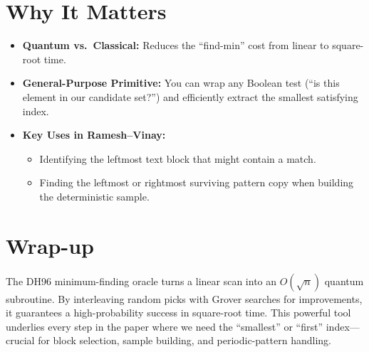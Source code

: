 \documentclass[11pt]{article}
\begin{document}
\section*{Why It Matters}
\begin{itemize}
    \item \textbf{Quantum vs.\ Classical:} Reduces the “find-min” cost from linear to square-root time.
    \item \textbf{General-Purpose Primitive:} You can wrap any Boolean test (“is this element in our candidate set?”) and efficiently extract the smallest satisfying index.
    \item \textbf{Key Uses in Ramesh--Vinay:}
          \begin{itemize}
              \item Identifying the leftmost text block that might contain a match.
              \item Finding the leftmost or rightmost surviving pattern copy when building the deterministic sample.
          \end{itemize}
\end{itemize}

\section*{Wrap-up}
The DH96 minimum-finding oracle turns a linear scan into an \(O(\sqrt{n})\) quantum subroutine. By interleaving random picks with Grover searches for improvements, it guarantees a high-probability success in square-root time. This powerful tool underlies every step in the paper where we need the “smallest” or “first” index—crucial for block selection, sample building, and periodic-pattern handling.
\end{document}
